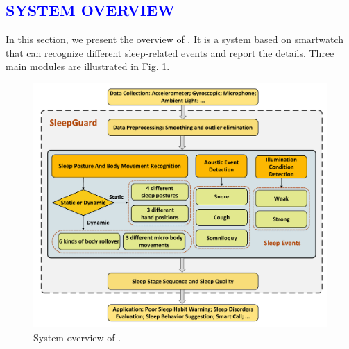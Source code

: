 \textcolor{blue}{\section{SYSTEM OVERVIEW}}
In this section, we present the overview of {\systemname}. It is a system based on smartwatch that can recognize different sleep-related events and report the details. Three main modules are illustrated in Fig. \ref{fig:overview}.

\begin{figure}[!thbp]
\centering
      \includegraphics[width=0.97\linewidth]{Figures/SystemFlow.pdf}
  \caption{System overview of {\systemname}.}\label{fig:overview}
\end{figure}


